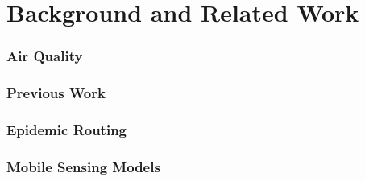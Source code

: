 \chapter{Background and Related Work}\label{background}
\subsection{Air Quality}\label{background_airquality}
\subsection{Previous Work}\label{background_previous_work}
      
\subsection{Epidemic Routing}\label{background_epidemic_routing}

\subsection{Mobile Sensing Models}\label{background_mobile_sensing_models}

